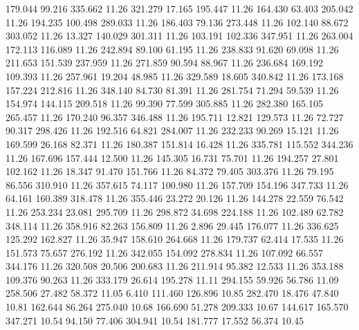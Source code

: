 179.044   99.216  335.662        11.26
 321.279   17.165  195.447        11.26
 164.430   63.403  205.042        11.26
 194.235  100.498  289.033        11.26
 186.403   79.136  273.448        11.26
 102.140   88.672  303.052        11.26
  13.327  140.029  301.311        11.26
 103.191  102.336  347.951        11.26
 263.004  172.113  116.089        11.26
 242.894   89.100   61.195        11.26
 238.833   91.620   69.098        11.26
 211.653  151.539  237.959        11.26
 271.859   90.594   88.967        11.26
 236.684  169.192  109.393        11.26
 257.961   19.204   48.985        11.26
 329.589   18.605  340.842        11.26
 173.168  157.224  212.816        11.26
 348.140   84.730   81.391        11.26
 281.754   71.294   59.539        11.26
 154.974  144.115  209.518        11.26
  99.390   77.599  305.885        11.26
 282.380  165.105  265.457        11.26
 170.240   96.357  346.488        11.26
 195.711   12.821  129.573        11.26
  72.727   90.317  298.426        11.26
 192.516   64.821  284.007        11.26
 232.233   90.269   15.121        11.26
 169.599   26.168   82.371        11.26
 180.387  151.814   16.428        11.26
 335.781  115.552  344.236        11.26
 167.696  157.444   12.500        11.26
 145.305   16.731   75.701        11.26
 194.257   27.801  102.162        11.26
  18.347   91.470  151.766        11.26
  84.372   79.405  303.376        11.26
  79.195   86.556  310.910        11.26
 357.615   74.117  100.980        11.26
 157.709  154.196  347.733        11.26
  64.161  160.389  318.478        11.26
 355.446   23.272   20.126        11.26
 144.278   22.559   76.542        11.26
 253.234   23.081  295.709        11.26
 298.872   34.698  224.188        11.26
 102.489   62.782  348.114        11.26
 358.916   82.263  156.809        11.26
   2.896   29.445  176.077        11.26
 336.625  125.292  162.827        11.26
  35.947  158.610  264.668        11.26
 179.737   62.414   17.535        11.26
 151.573   75.657  276.192        11.26
 342.055  154.092  278.834        11.26
 107.092   66.557  344.176        11.26
 320.508   20.506  200.683        11.26
 211.914   95.382   12.533        11.26
 353.188  109.376   90.263        11.26
 333.179   26.614  195.278        11.11
 294.155   59.926   56.786        11.09
 258.506   27.482   58.372        11.05
   6.410  111.460  126.896        10.85
 282.470   18.476   47.840        10.81
 162.644   86.264  275.040        10.68
 166.690   51.278  209.333        10.67
 144.617  165.570  347.271        10.54
  94.150   77.406  304.941        10.54
 181.777   17.552   56.374        10.45
